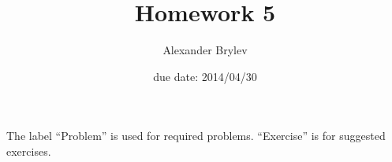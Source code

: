 
         \newcommand\alg[1]{\ensuremath{\mathbf{#1}}}
         \newcommand{\<}{\ensuremath{\langle}}
         \renewcommand{\>}{\ensuremath{\rangle}}
         \newcommand\fld[1]{\ensuremath{\mathbb{#1}}}
         \newcommand\Z{\fld{Z}}
         \newcommand\GF{\ensuremath{\operatorname{GF}}}
         \author{Alexander Brylev}
         \title{Homework 5}
         \date{due date: 2014/04/30}



\maketitle

\noindent The label ``Problem'' is used for required problems. ``Exercise''
is for suggested exercises.


